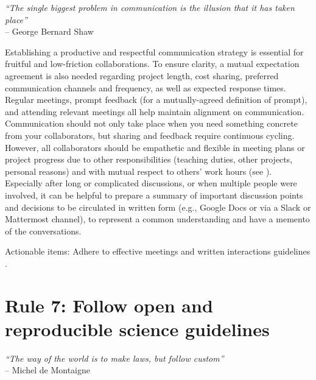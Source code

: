 \documentclass{article}
\begin{document}
\begin{flushright}
\rightskip=1cm\textit{``The single biggest problem in communication is the illusion that it has taken place''} \\
\vspace{.2em}
\rightskip=0cm -- George Bernard Shaw
\end{flushright}

Establishing a productive and respectful communication strategy is essential for fruitful and low-friction collaborations. To ensure clarity, a mutual expectation agreement is also needed regarding project length, cost sharing, preferred communication channels and frequency, as well as expected response times. Regular meetings, prompt feedback (for a mutually-agreed definition of prompt), and attending relevant meetings all help maintain alignment on communication. Communication should not only take place when you need something concrete from your collaborators, but sharing and feedback require continuous cycling. However, all collaborators should be empathetic and flexible in meeting plans or project progress due to other responsibilities (teaching duties, other projects, personal reasons) and with mutual respect to others’ work hours (see ). Especially after long or complicated discussions, or when multiple people were involved, it can be helpful to prepare a summary of important discussion points and decisions to be circulated in written form (e.g., Google Docs or via a Slack or Mattermost channel), to represent a common understanding and have a memento of the conversations.

Actionable items: Adhere to effective meetings \cite{leblanc2019planning} and written interactions guidelines \cite{gruber2020email}.

\section*{Rule 7: Follow open and reproducible science guidelines} %
\label{rule7_repro}

\begin{flushright}
\rightskip=1cm\textit{``The way of the world is to make laws, but follow custom''} \\
\vspace{.2em}
\rightskip=0cm -- Michel de Montaigne
\end{flushright}
\end{document}
